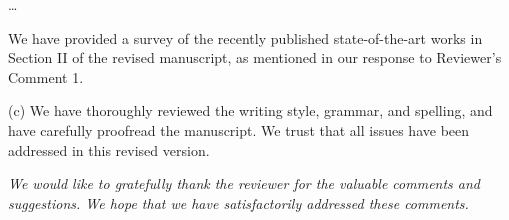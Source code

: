 \documentclass[12pt,draftclsnofoot,onecolumn]{IEEEtran}
\newenvironment{my}[2]%
{\begin{list}{}%
{\setlength{\rightmargin}{#1}\setlength{\leftmargin}{#2}}%


 \item[]{}

} {\end{list}}
\begin{document}
\begin{enumerate}
\begin{my}{1cm}{1cm}
{{	\dots
	
	
	
}}
\end{my}\vspace{6mm}

We have provided a survey of the recently published state-of-the-art works in Section II of the revised manuscript, as mentioned in our response to Reviewer's Comment 1.\newline

(c) We have thoroughly reviewed the writing style, grammar, and spelling, and have carefully proofread the manuscript. We trust that all issues have been addressed in this revised version. 

\vspace{10mm}



\end{enumerate}

\textit{We would like to gratefully thank the reviewer for the valuable comments and suggestions. We hope that we have satisfactorily addressed these comments.}\newline




	\setcounter{section}{1}
\setcounter{table}{0}
\end{document}
